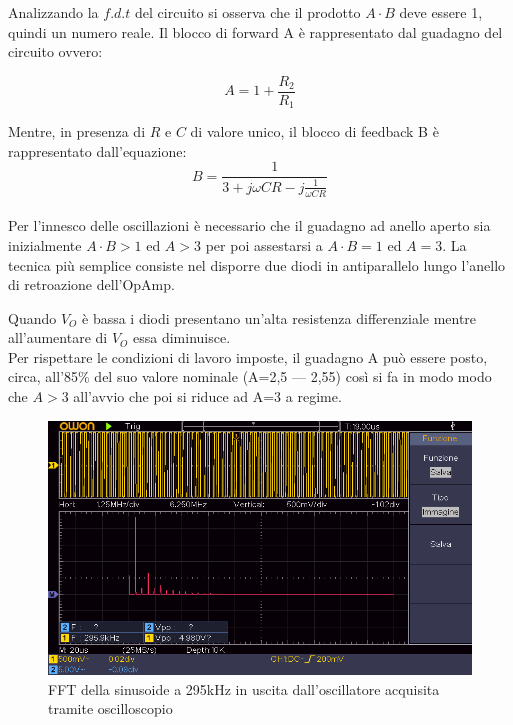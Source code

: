 \documentclass[titlepage]{report}
\begin{document}
	\noindent Analizzando la $f.d.t$ del circuito si osserva che il prodotto $A\cdot B$ deve essere 1, quindi un numero reale.
	Il blocco di forward A è rappresentato dal guadagno del circuito ovvero: 

	\begin{equation}
		\label{eq:LF356_Gain}
		A = 1 + \frac{R_2}{R_1}
	\end{equation}


	Mentre, in presenza di $R$ e $C$ di valore unico, il blocco di feedback B è rappresentato dall'equazione:
	\\
	\begin{equation}
		\label{eq:LF356_Feedback}
		B = \frac{1}{3 + j\omega C R - j\frac{1}{\omega C R}}
	\end{equation}
	\\
	Per l'innesco delle oscillazioni è necessario che il guadagno ad anello aperto sia inizialmente $A\cdot B>1$ ed $A>3$ per poi assestarsi a $A\cdot B=1$ ed $A=3$. La tecnica più semplice consiste nel disporre due diodi in antiparallelo lungo l'anello di retroazione dell'OpAmp.
	
	\noindent Quando \textit{$V_{O}$} è bassa i diodi presentano un'alta resistenza differenziale mentre all'aumentare di \textit{$V_{O}$} essa diminuisce. 
	\\ Per rispettare le condizioni di lavoro imposte, il guadagno A può essere posto, circa, all'85\% del suo valore nominale (A=2,5 — 2,55) così si fa in modo modo che $A>3$ all'avvio che poi si riduce ad A=3 a regime.

	\begin{figure}[H]
		\centering
		\includegraphics[scale=0.9]{Immagini/009_OscillatoreWienFFT.png}
		\caption{FFT della sinusoide a 295kHz in uscita dall'oscillatore acquisita tramite oscilloscopio}
		\label{fig:FFT295k}
	\end{figure}
	
\end{document}
